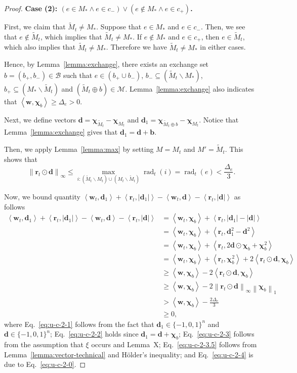 \documentclass{article}
\newcommand{\M}{\mathcal M}
\newcommand{\B}{\mathcal B}
\newcommand{\del}{\backslash}
\DeclareMathOperator{\rad}{rad}
\newcommand{\inn}[1]{\left\langle #1 \right\rangle}
\newcommand{\nor}[1]{\left\|#1\right\|}
\renewcommand{\vec}[1]{\boldsymbol{#1}}
\begin{document}
\begin{spacing}{1.1}
\begin{proof}
\textbf{Case (2): $(e \in M_* \wedge e\in c_-) \vee (e \not \in M_* \wedge e\in c_+)$.}

First, we claim that $\tilde M_t \not= M_*$.
Suppose that $e\in M_*$ and $e\in c_-$.
Then, we see that $e\not\in \tilde M_t$, which implies that $\tilde M_t\not=M_*$.
If $e\not \in M_*$ and $e\in c_+$, then $e\in \tilde M_t$, which also implies that $\tilde M_t\not= M_*$.
Therefore we have $\tilde M_t\not=M_*$ in either cases.


Hence, by Lemma~\ref{lemma:exchange}, there exists an exchange set $b=(b_+,b_-)\in \B$ such that 
$e \in (b_+ \cup b_-)$, $b_-\subseteq  (\tilde M_t \del M_*)$, $b_+ \subseteq (M_* \del \tilde M_t)$ and
$(\tilde M_t \oplus b) \in \M$.
Lemma~\ref{lemma:exchange} also indicates that $\inn{\vec w, \vec \chi_b} \ge \Delta_e > 0$.

Next, we define vectors $\vec d = \vec \chi_{\tilde M_t} - \vec \chi_{M_t}$ and $\vec d_1 = \vec\chi_{\tilde M_t\oplus b}-\vec\chi_{M_t}$.
Notice that Lemma~\ref{lemma:exchange} gives that $\vec d_1= \vec d+\vec b$.

Then, we apply Lemma~\ref{lemma:max} by setting $M = M_t$ and $M' = \tilde M_t$. 
This shows that 
\begin{equation}
\nor{\vec r_t\odot \vec d}_\infty \le \max_{i: (\tilde M_t \del M_t)\cup (M_t\del \tilde M_t)} \rad_t(i) = \rad_t(e) < \frac{\Delta_e}{3}.
\label{eq:u-c-2-0}
\end{equation}

Now, we bound quantity $\inn{\vec w_t, \vec d_1}+\inn{\vec r_t, |\vec d_1|}
-\inn{\vec w_t, \vec d}-\inn{\vec r_t,  |\vec d|}$ as follows
\begin{align}
\inn{\vec w_t, \vec d_1}+\inn{\vec r_t, |\vec d_1|}
-\inn{\vec w_t, \vec d}-\inn{\vec r_t,  |\vec d|}
& = \inn{\vec w_t, \vec \chi_b} + \inn{\vec r_t, |\vec d_1|-|\vec d|} \nonumber\\
& =	\inn{\vec w_t, \vec \chi_b} + \inn{\vec r_t, \vec d_1^2-\vec d^2} \label{eq:u-c-2-1} \\
& =	\inn{\vec w_t, \vec \chi_b} + \inn{\vec r_t, 2\vec d\odot \vec \chi_b +\vec \chi_b^2} \label{eq:u-c-2-2} \\
& =	\inn{\vec w_t, \vec \chi_b} + \inn{\vec r_t, \vec\chi_b^2} + 2\inn{\vec r_t\odot \vec d, \vec \chi_b} \nonumber \\
& \ge \inn{\vec w, \vec \chi_b}- 2\inn{\vec r_t\odot \vec d, \vec \chi_b}  \label{eq:u-c-2-3} \\
& \ge \inn{\vec w, \vec \chi_b}-2\nor{\vec r_t\odot \vec d}_\infty\nor{\vec\chi_b}_1 \label{eq:u-c-2-3.5} \\
& > \inn{\vec w, \vec \chi_b}-\frac{2\Delta_e}{3} \label{eq:u-c-2-4} \\
& \ge 0 \label{eq:u-c-2-5},
\end{align}
where Eq.~\eqref{eq:u-c-2-1} follows from the fact that $\vec d_1\in \{-1,0,1\}^n$ and $\vec d \in \{-1,0,1\}^n$;
Eq.~\eqref{eq:u-c-2-2} holds since $\vec d_1=\vec d+\vec \chi_b$;
Eq.~\eqref{eq:u-c-2-3} follows from the assumption that $\xi$ occurs and Lemma~X;
Eq.~\eqref{eq:u-c-2-3.5} follows from Lemma~\ref{lemma:vector-technical}  and H\"older's inequality;
and Eq.~\eqref{eq:u-c-2-4} is due to Eq.~\eqref{eq:u-c-2-0}.


\end{proof}
\end{spacing}
\end{document}

